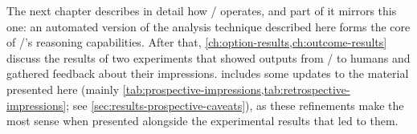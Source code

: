 The next chapter describes in detail how \dunyazad/ operates, and part of it mirrors this one: an automated version of the analysis technique described here forms the core of \dunyazad/'s reasoning capabilities.
%
After that, \cref{ch:option-results,ch:outcome-results} discuss the results of two experiments that showed outputs from \dunyazad/ to humans and gathered feedback about their impressions.
%
 includes some updates to the material presented here (mainly \cref{tab:prospective-impressions,tab:retrospective-impressions}; see \cref{sec:results-prospective-caveats}), as these refinements make the most sense when presented alongside the experimental results that led to them.

